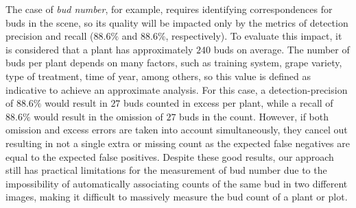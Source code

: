 \documentclass[a4paper,authoryear,review]{elsarticle}
\begin{document}
	
	The case of \emph{bud number}, for example, requires identifying correspondences for buds in the scene, so its quality will be impacted only by the metrics of detection precision and recall ($88.6\%$ and $88.6\%$, respectively). To evaluate this impact, it is considered that a plant has approximately $240$ buds on average. The number of buds per plant depends on many factors, such as training system, grape variety, type of treatment, time of year, among others, so this value is defined as indicative to achieve an approximate analysis. For this case, a detection-precision of $88.6\%$ would result in $27$ buds counted in excess per plant, while a recall of $88.6\%$ would result in the omission of $27$ buds in the count. 
	However, if both omission and excess errors are taken into account simultaneously, they cancel out resulting in not a single extra or missing count as the expected false negatives are equal to the expected false positives. Despite these good results, our approach still has practical limitations for the measurement of bud number due to the impossibility of automatically associating counts of the same bud in two different images, making it difficult to massively measure the bud count of a plant or plot. 
	
\end{document}
